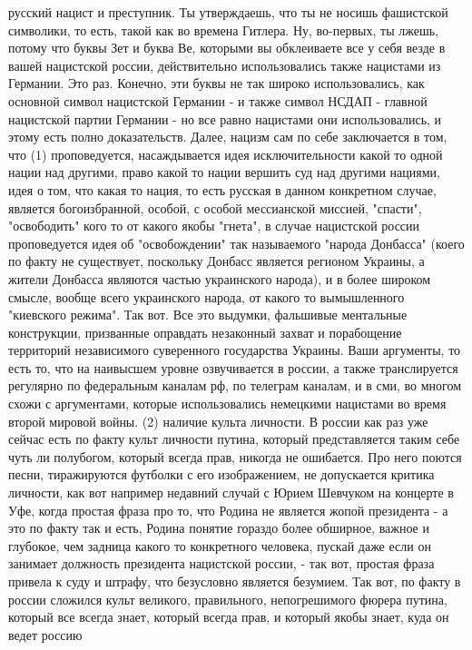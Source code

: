 русский нацист и преступник. Ты утверждаешь, что ты не носишь фашистской
символики, то есть, такой как во времена Гитлера. Ну, во-первых, ты лжешь,
потому что буквы Зет и буква Ве, которыми вы обклеиваете все у себя везде в
вашей нацистской россии, действительно использовались также нацистами из
Германии. Это раз. Конечно, эти буквы не так широко использовались, как
основной символ нацистской Германии - и также символ НСДАП - главной нацистской
партии Германии - но все равно нацистами они использовались, и этому есть полно
доказательств. Далее, нацизм сам по себе заключается в том, что (1)
проповедуется, насаждывается идея исключительности какой то одной нации над
другими, право какой то нации вершить суд над другими нациями, идея о том, что
какая то нация, то есть русская в данном конкретном случае, является
богоизбранной, особой, с особой мессианской миссией, "спасти", "освободить"
кого то от какого якобы "гнета", в случае нацистской россии проповедуется идея
об "освобождении" так называемого "народа Донбасса" (коего по факту не
существует, поскольку Донбасс является регионом Украины, а жители Донбасса
являются частью украинского народа), и в более широком смысле, вообще всего
украинского народа, от какого то вымышленного "киевского режима". Так вот.  Все
это выдумки, фальшивые ментальные конструкции, призванные оправдать незаконный
захват и порабощение территорий независимого суверенного государства Украины.
Ваши аргументы, то есть то, что на наивысшем уровне озвучивается в россии, а
также транслируется регулярно по федеральным каналам рф, по телеграм каналам, и
в сми, во многом схожи с аргументами, которые использовались немецкими
нацистами во время второй мировой войны.  (2) наличие культа личности. В россии
как раз уже сейчас есть по факту культ личности путина, который представляется
таким себе чуть ли полубогом, который всегда прав, никогда не ошибается. Про
него поются песни, тиражируются футболки с его изображением, не допускается
критика личности, как вот например недавний случай с Юрием Шевчуком на концерте
в Уфе, когда простая фраза про то, что Родина не является жопой президента - а
это по факту так и есть, Родина понятие гораздо более обширное, важное и
глубокое, чем задница какого то конкретного человека, пускай даже если он
занимает должность президента нацистской россии, - так вот, простая фраза
привела к суду и штрафу, что безусловно является безумием. Так вот, по факту в
россии сложился культ великого, правильного, непогрешимого фюрера путина,
который все всегда знает, который всегда прав, и который якобы знает, куда он
ведет россию


